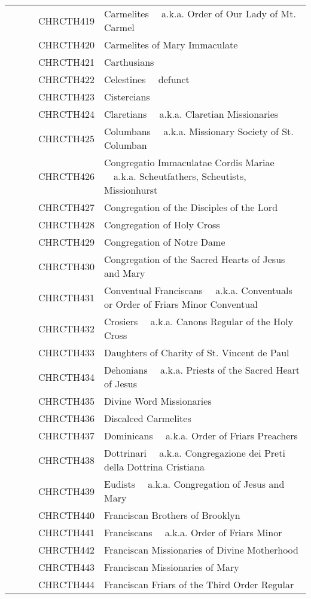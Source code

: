 \documentclass[12pt]{article}
\begin{document}
\begin{tiny}
\begin{center}
\begin{longtable}{|l|l|}
~~~~~~CHRCTH419 & Carmelites 	~~a.k.a. Order of Our Lady of Mt. Carmel \\
~~~~~~CHRCTH420 & Carmelites of Mary Immaculate \\
~~~~~~CHRCTH421 & Carthusians \\
~~~~~~CHRCTH422 & Celestines 	~~defunct \\
~~~~~~CHRCTH423 & Cistercians \\
~~~~~~CHRCTH424 & Claretians 	~~a.k.a. Claretian Missionaries \\
~~~~~~CHRCTH425 & Columbans 	~~a.k.a. Missionary Society of St. Columban \\
~~~~~~CHRCTH426 & Congregatio Immaculatae Cordis Mariae 	~~a.k.a. Scheutfathers, Scheutists, Missionhurst \\
~~~~~~CHRCTH427 & Congregation of the Disciples of the Lord \\
~~~~~~CHRCTH428 & Congregation of Holy Cross \\
~~~~~~CHRCTH429 & Congregation of Notre Dame \\
~~~~~~CHRCTH430 & Congregation of the Sacred Hearts of Jesus and Mary \\
~~~~~~CHRCTH431 & Conventual Franciscans 	~~a.k.a. Conventuals or Order of Friars Minor Conventual \\
~~~~~~CHRCTH432 & Crosiers 	~~a.k.a. Canons Regular of the Holy Cross \\
~~~~~~CHRCTH433 & Daughters of Charity of St. Vincent de Paul \\
~~~~~~CHRCTH434 & Dehonians 	~~a.k.a. Priests of the Sacred Heart of Jesus \\
~~~~~~CHRCTH435 & Divine Word Missionaries \\
~~~~~~CHRCTH436 & Discalced Carmelites \\
~~~~~~CHRCTH437 & Dominicans 	~~a.k.a. Order of Friars Preachers \\
~~~~~~CHRCTH438 & Dottrinari 	~~a.k.a. Congregazione dei Preti della Dottrina Cristiana \\
~~~~~~CHRCTH439 & Eudists 	~~a.k.a. Congregation of Jesus and Mary \\
~~~~~~CHRCTH440 & Franciscan Brothers of Brooklyn \\
~~~~~~CHRCTH441 & Franciscans 	~~a.k.a. Order of Friars Minor \\
~~~~~~CHRCTH442 & Franciscan Missionaries of Divine Motherhood \\
~~~~~~CHRCTH443 & Franciscan Missionaries of Mary \\
~~~~~~CHRCTH444 & Franciscan Friars of the Third Order Regular \\

\end{longtable}
\end{center}
\end{tiny}
\end{document}
